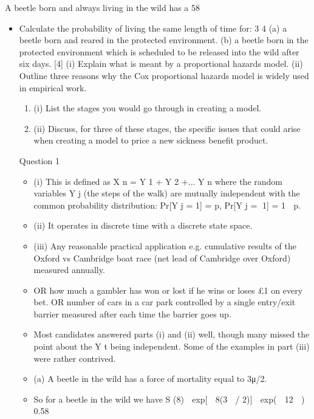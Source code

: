 \documentclass[a4paper,12pt]{article}
\begin{document}
A beetle born and always living in the wild has a 58%
\begin{itemize}
\item Calculate the probability of living the same length of time for:
3
4
(a) a beetle born and reared in the protected environment.
(b) a beetle born in the protected environment which is scheduled to be released
into the wild after six days.
[4]
(i) Explain what is meant by a proportional hazards model.
(ii) Outline three reasons why the Cox proportional hazards model is widely used
in empirical work.

\begin{enumerate}
\item (i) List the stages you would go through in creating a model.
\item (ii) Discuss, for three of these stages, the specific issues that could arise when
creating a model to price a new sickness benefit product.
\end{enumerate}
\newpage
Question 1
\begin{itemize}
\item (i)
This is defined as X n = Y 1 + Y 2 +... Y n
where the random variables Y j (the steps of the walk) are mutually
independent with the common probability distribution:
Pr[Y j = 1] = p,
Pr[Y j = 1] = 1  p.
\item (ii) It operates in discrete time with a discrete state space.
\item (iii) Any reasonable practical application
e.g. cumulative results of the Oxford vs Cambridge boat race (net lead
of Cambridge over Oxford) measured annually.
\item OR how much a gambler has won or lost if he wins or loses
£1 on every bet.
OR number of cars in a car park controlled by a single entry/exit
barrier measured after each time the barrier goes up.
\item Most candidates answered parts (i) and (ii) well, though many missed the point about the Y t
being independent. Some of the examples in part (iii) were rather contrived.
\end{itemize}
\newpage
\begin{itemize}
\item (a)
A beetle in the wild has a force of mortality equal to 3μ/2.
\item So for a beetle in the wild
we have S (8)  exp[  8(3  / 2)]  exp(  12  )  0.58

\end{itemize}
\end{itemize}
\end{document}
